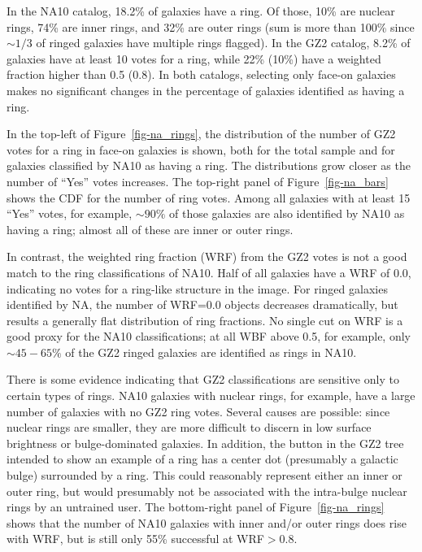\documentclass[useAMS,usenatbib]{mn2e}
\begin{document}
In the NA10 catalog, 18.2\% of galaxies have a ring. Of those, 10\% are nuclear rings, 74\% are inner rings, and 32\% are outer rings (sum is more than 100\% since $\sim1/3$ of ringed galaxies have multiple rings flagged). In the GZ2 catalog, 8.2\% of galaxies have at least 10 votes for a ring, while 22\% (10\%) have a weighted fraction higher than 0.5 (0.8). In both catalogs, selecting only face-on galaxies makes no significant changes in the percentage of galaxies identified as having a ring. 

In the top-left of Figure~\ref{fig-na_rings}, the distribution of the number of GZ2 votes for a ring in face-on galaxies is shown, both for the total sample and for galaxies classified by NA10 as having a ring. The distributions grow closer as the number of ``Yes'' votes increases. The top-right panel of Figure~\ref{fig-na_bars} shows the CDF for the number of ring votes. Among all galaxies with at least 15 ``Yes'' votes, for example, $\sim90\%$ of those galaxies are also identified by NA10 as having a ring; almost all of these are inner or outer rings.  

In contrast, the weighted ring fraction (WRF) from the GZ2 votes is not a good match to the ring classifications of NA10. Half of all galaxies have a WRF of 0.0, indicating no votes for a ring-like structure in the image. For ringed galaxies identified by NA, the number of WRF=0.0 objects decreases dramatically, but results a generally flat distribution of ring fractions. No single cut on WRF is a good proxy for the NA10 classifications; at all WBF above 0.5, for example, only $\sim45-65\%$ of the GZ2 ringed galaxies are identified as rings in NA10.  

There is some evidence indicating that GZ2 classifications are sensitive only to certain types of rings. NA10 galaxies with nuclear rings, for example, have a large number of galaxies with no GZ2 ring votes. Several causes are possible: since nuclear rings are smaller, they are more difficult to discern in low surface brightness or bulge-dominated galaxies. In addition, the button in the GZ2 tree intended to show an example of a ring has a center dot (presumably a galactic bulge) surrounded by a ring. This could reasonably represent either an inner or outer ring, but would presumably not be associated with the intra-bulge nuclear rings by an untrained user. The bottom-right panel of Figure~\ref{fig-na_rings} shows that the number of NA10 galaxies with inner and/or outer rings does rise with WRF, but is still only 55\% successful at WRF$ > 0.8$. 
\end{document}
